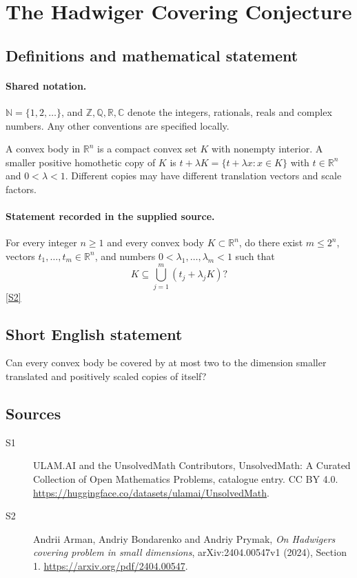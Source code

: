 \documentclass[11pt]{article}
\newcommand{\sref}[2]{\hyperlink{source:#1:#2}{[S#2]}}
\begin{document}
\section{The Hadwiger Covering Conjecture}\label{statement}

\subsection{Definitions and mathematical statement}

\paragraph{Shared notation.}$\mathbb N=\{1,2,\ldots\}$, and $\mathbb Z,\mathbb Q,\mathbb R,\mathbb C$ denote the integers, rationals, reals and complex numbers. Any other conventions are specified locally.


A convex body in $\mathbb R^n$ is a compact convex set $K$ with nonempty interior. A smaller positive homothetic copy of $K$ is $t+\lambda K=\{t+\lambda x:x\in K\}$ with $t\in\mathbb R^n$ and $0<\lambda<1$. Different copies may have different translation vectors and scale factors.
\paragraph{Statement recorded in the supplied source.}
For every integer $n\geq1$ and every convex body $K\subset\mathbb R^n$, do there exist $m\leq2^n$, vectors $t_1,\ldots,t_m\in\mathbb R^n$, and numbers $0<\lambda_1,\ldots,\lambda_m<1$ such that
\[
K\subseteq\bigcup_{j=1}^m(t_j+\lambda_jK)?
\] \sref{statement}{2}

\subsection{Short English statement}
Can every convex body be covered by at most two to the dimension smaller translated and positively scaled copies of itself?
\subsection{Sources}
\begin{description}
\item[\hypertarget{source:statement:1}{S1}] ULAM.AI and the UnsolvedMath Contributors, UnsolvedMath: A Curated Collection of Open Mathematics Problems, catalogue entry. CC BY 4.0. \url{https://huggingface.co/datasets/ulamai/UnsolvedMath}.
\item[\hypertarget{source:statement:2}{S2}] Andrii Arman, Andriy Bondarenko and Andriy Prymak, \emph{On Hadwiger\textquotesingle s covering problem in small dimensions}, arXiv:2404.00547v1 (2024), Section 1. \url{https://arxiv.org/pdf/2404.00547}.
\end{description}
\label{end:statement}
\end{document}
